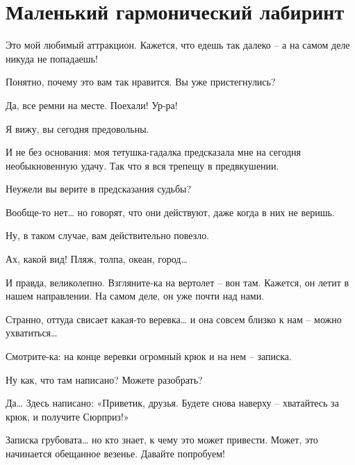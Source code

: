\documentclass[../main.tex]{subfiles}
\begin{document}
\section{Маленький гармонический лабиринт}


\begin{Dialogue}


 Это мой любимый аттракцион. Кажется, что едешь так далеко \--- а на самом деле никуда не попадаешь!

 Понятно, почему это вам так нравится. Вы уже пристегнулись?

 Да, все ремни на месте. Поехали! Ур-ра!

 Я вижу, вы сегодня предовольны.

 И не без основания: моя тетушка-гадалка предсказала мне на сегодня необыкновенную удачу. Так что я вся трепещу в предвкушении.

 Неужели вы верите в предсказания судьбы?

 Вообще-то нет\ldots{} но говорят, что они действуют, даже когда в них не веришь.

 Ну, в таком случае, вам действительно повезло.

 Ах, какой вид! Пляж, толпа, океан, город\ldots{}

 И правда, великолепно. Взгляните-ка на вертолет \--- вон там. Кажется, он летит в нашем направлении. На самом деле, он уже почти над нами.

 Странно, оттуда свисает какая-то веревка\ldots{} и она совсем близко к нам \--- можно ухватиться\ldots{}

 Смотрите-ка: на конце веревки огромный крюк и на нем \--- записка.


 Ну как, что там написано? Можете разобрать?

 Да\ldots{} Здесь написано: «Приветик, друзья. Будете снова наверху \--- хватайтесь за крюк, и получите Сюрприз!»

 Записка грубовата\ldots{} но кто знает, к чему это может привести. Может, это начинается обещанное везенье. Давайте попробуем!


\end{Dialogue}
\end{document}
